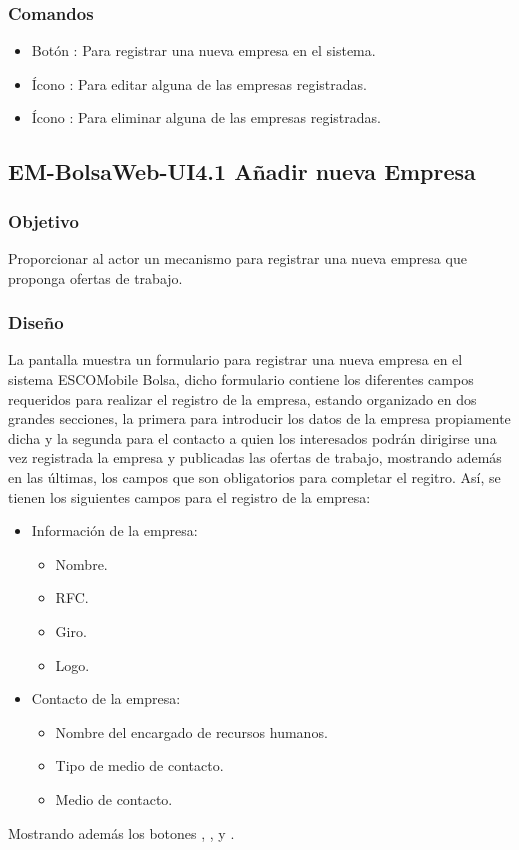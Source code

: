 \subsubsection{Comandos}
 	\begin{itemize}
		\item Botón : Para registrar una nueva empresa en el sistema.  
		\item Ícono : Para editar alguna de las empresas registradas.
		\item Ícono : Para eliminar alguna de las empresas registradas.
	\end{itemize}




\subsection{EM-BolsaWeb-UI4.1 Añadir nueva Empresa}

\subsubsection{Objetivo}
	\noindent
	Proporcionar al actor un mecanismo para registrar una nueva empresa que proponga ofertas de trabajo.
\subsubsection{Diseño}
	\noindent
	La pantalla muestra un formulario para registrar una nueva empresa en el sistema ESCOMobile Bolsa, dicho formulario contiene los diferentes campos requeridos para realizar el registro de la empresa, estando organizado en dos grandes secciones, la primera para introducir los datos de la empresa propiamente dicha y la segunda para el contacto a quien los interesados podrán dirigirse una vez registrada la empresa y publicadas las ofertas de trabajo, mostrando además en las últimas, los campos que son obligatorios para completar el regitro. Así, se tienen los siguientes campos para el registro de la empresa:
	\begin{itemize}
		\item Información de la empresa:
		\begin{itemize}
			\item Nombre.
			\item RFC.
			\item Giro.
			\item Logo.
		\end{itemize}
		\item Contacto de la empresa:
		\begin{itemize}
			\item Nombre del encargado de recursos humanos.
			\item Tipo de medio de contacto. 
			\item Medio de contacto. 
		\end{itemize}
	\end{itemize}
	Mostrando además los botones , \IUbutton{+},  y .

